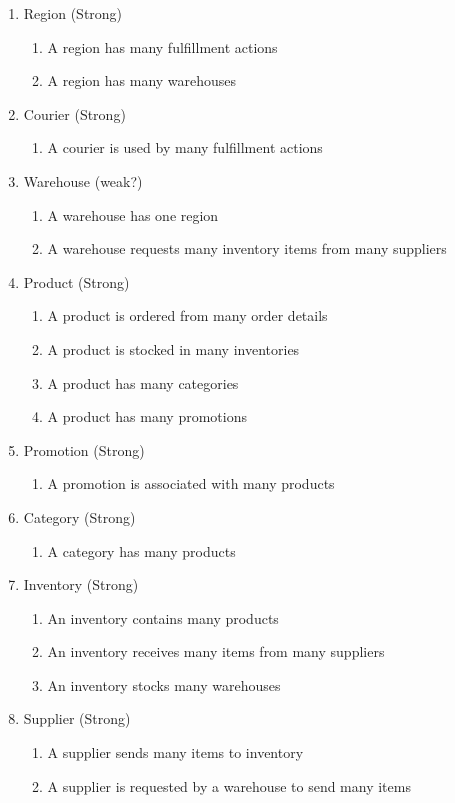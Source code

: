 \begin{enumerate}
\item Region (Strong)
\begin{enumerate}
	\item A region has many fulfillment actions
	\item A region has many warehouses
\end{enumerate}

\item Courier (Strong)
\begin{enumerate}
	\item A courier is used by many fulfillment actions
\end{enumerate}
	
\item Warehouse (weak?)
\begin{enumerate}
	\item A warehouse has one region
	\item A warehouse requests many inventory items from many suppliers
\end{enumerate}

\item Product (Strong)
\begin{enumerate}
	\item A product is ordered from many order details
	\item A product is stocked in many inventories
	\item A product has many categories
	\item A product has many promotions
\end{enumerate}

\item Promotion (Strong)
\begin{enumerate}
	\item A promotion is associated with many products
\end{enumerate}

\item Category (Strong)
\begin{enumerate}
	\item A category has many products
\end{enumerate}

\item Inventory (Strong)
\begin{enumerate}
	\item An inventory contains many products
	\item An inventory receives many items from many suppliers
	\item An inventory stocks many warehouses
\end{enumerate}

\item Supplier (Strong)
\begin{enumerate}
	\item A supplier sends many items to inventory
	\item A supplier is requested by a warehouse to send many items
\end{enumerate}

\end{enumerate}
